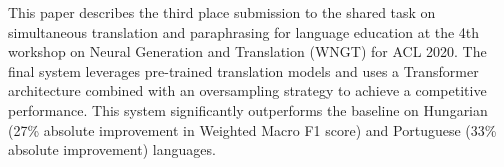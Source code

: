 This paper describes the third place submission to the shared task on simultaneous translation and paraphrasing for language education at the 4th workshop on Neural Generation and Translation (WNGT) for ACL 2020. The final system leverages pre-trained translation models and uses a Transformer architecture combined with an oversampling strategy to achieve a competitive performance. This system significantly outperforms the baseline on Hungarian (27\% absolute improvement in Weighted Macro F1 score) and Portuguese (33\% absolute improvement) languages.
